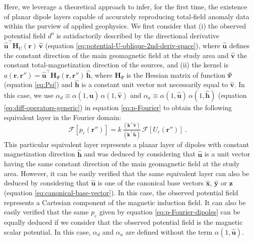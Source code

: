Here, we leverage a theoretical approach to infer, for the first time, the existence of 
planar dipole layers capable of accurately reproducing total-field anomaly data 
within the purview of applied geophysics. 
We first consider that (i) the observed potential field $d^{o}$ 
is satisfactorily described by the directional derivative $\hat{\mathbf{u}}^{\top} \mathbf{H}_{U}(\mathbf{r}) \, \hat{\mathbf{v}}$ 
(equation \ref{eq:potential-U-oblique-2nd-deriv-space}), where $\hat{\mathbf{u}}$ defines the constant direction of the main geomagnetic
field at the study area and $\hat{\mathbf{v}}$ the constant total-magnetization direction of the sources, and (ii)
the kernel is $a(\mathbf{r}, \mathbf{r}'') = \hat{\mathbf{u}}^{\top} \mathbf{H}_{\Psi}(\mathbf{r}, \mathbf{r}'') \, \hat{\mathbf{h}}$,
where $\mathbf{H}_{\Psi}$ is the Hessian matrix \citep[e.g.,][ p. 158]{kaplan2002} of
function $\Psi$ (equation \ref{eq:Psi}) and $\hat{\mathbf{h}}$ is a constant unit vector not necessarily equal to 
$\hat{\mathbf{v}}$.
In this case, we use $\alpha_{d} \equiv \alpha(1, \hat{\mathbf{u}}) \, \alpha(1, \hat{\mathbf{v}})$ and 
$\alpha_{a} \equiv \alpha(1, \hat{\mathbf{u}}) \, \alpha(1, \hat{\mathbf{h}})$ 
(equation \ref{eq:diff-operators-generic}) in equation \ref{eq:p-Fourier} to obtain the following equivalent layer 
in the Fourier domain:
\begin{equation}
	\mathcal{F} [ p_{\varepsilon}(\mathbf{r}'') ] =
	k \, \tfrac{\left(\mathbf{k}^{\top} \hat{\mathbf{v}} \right)}{\left(\mathbf{k}^{\top} \hat{\mathbf{h}} \right)} \,
	\mathcal{F} \left[ U_{\varepsilon}(\mathbf{r}'') \right] \: .
	\label{eq:p-Fourier-dipoles}
\end{equation}
This particular equivalent layer represents a planar layer of dipoles with constant magnetization direction
$\hat{\mathbf{h}}$ and was deduced by considering
that $\hat{\mathbf{u}}$ is a unit vector having the same constant direction of the main geomagnetic field at the study area.
However, it can be easily verified that the same equivalent layer can also be deduced by considering that $\hat{\mathbf{u}}$ is one of the
canonical base vectors $\hat{\mathbf{x}}$, $\hat{\mathbf{y}}$ or $\hat{\mathbf{z}}$ (equation \ref{eq:canonical-base-vector}).
In this case, the observed potential field represents a Cartesian component of the magnetic induction field.
It can also be easily verified that the same $p_{\varepsilon}$ given by equation 
\ref{eq:p-Fourier-dipoles} can be equally deduced if we consider that the 
observed potential field is the magnetic scalar potential. In this case, $\alpha_{d}$ and $\alpha_{a}$ are defined
without the term $\alpha(1, \hat{\mathbf{u}})$.


